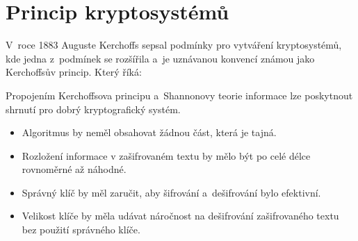 \section{Princip kryptosystémů}
V~roce 1883 Auguste Kerchoffs sepsal podmínky pro vytváření kryptosystémů, kde jedna z~podmínek se rozšířila a~je uznávanou konvencí známou jako Kerchoffsův princip. Který říká: \newline\begin{quote}
    \textit{}
\end{quote}
\newpage
Propojením Kerchoffsova principu a~Shannonovy teorie informace lze poskytnout shrnutí pro dobrý kryptografický systém.
\begin{itemize}
    \item Algoritmus by neměl obsahovat žádnou část, která je tajná.
    \item Rozložení informace v zašifrovaném textu by mělo být po celé délce rovnoměrné až náhodné.
    \item Správný klíč by měl zaručit, aby šifrování a~dešifrování bylo efektivní.
    \item Velikost klíče by měla udávat náročnost na dešifrování zašifrovaného textu bez použití správného klíče.\cite{Mao0130669431ISBN}
\end{itemize}

